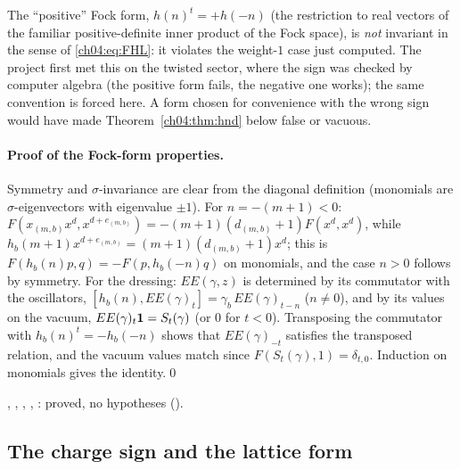 \begin{warning}
The ``positive'' Fock form, $h(n)^t=+h(-n)$ (the restriction to real vectors of the familiar
positive-definite inner product of the Fock space), is \emph{not} invariant in the sense of
\eqref{ch04:eq:FHL}: it violates the weight-$1$ case just computed. The project first met this on the
twisted sector, where the sign was checked by computer algebra (the positive form fails, the
negative one works); the same convention is forced here. A form chosen for convenience with the
wrong sign would have made Theorem~\ref{ch04:thm:hnd} below false or vacuous.
\end{warning}

\paragraph{Proof of the Fock-form properties.} Symmetry and $\sigma$-invariance are clear from the
diagonal definition (monomials are $\sigma$-eigenvectors with eigenvalue $\pm1$). For $n=-(m+1)<0$:
$F(x_{(m,b)}x^d,x^{d+e_{(m,b)}})=-(m+1)(d_{(m,b)}+1)F(x^d,x^d)$, while
$h_b(m+1)x^{d+e_{(m,b)}}=(m+1)(d_{(m,b)}+1)x^d$; this is $F(h_b(n)p,q)=-F(p,h_b(-n)q)$ on monomials,
and the case $n>0$ follows by symmetry. For the dressing: $EE(\gamma,z)$ is determined by its
commutator with the oscillators, $[h_b(n),EE(\gamma)_t]=\gamma_b\,EE(\gamma)_{t-n}$ ($n\neq0$), and by its
values on the vacuum, $EE(\gamma)_t\mathbf{1}=S_t(\gamma)$ (or $0$ for $t<0$). Transposing the commutator with
$h_b(n)^t=-h_b(-n)$ shows that $EE(\gamma)_{-t}$ satisfies the transposed relation, and the vacuum
values match since $F(S_t(\gamma),1)=\delta_{t,0}$. Induction on monomials gives the identity.\qed

\begin{status}
, , , , :
proved, no hypotheses ().
\end{status}

\subsection{The charge sign and the lattice form}


